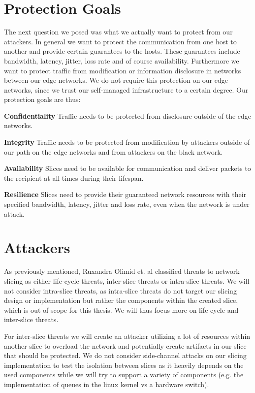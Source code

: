 \section{Protection Goals}
\label{protection_goals}
The next question we posed was what we actually want to protect from our attackers. In general we want to protect the communication from one host to another and provide certain guarantees to the hosts. These guarantees include bandwidth, latency, jitter, loss rate and of course availability. Furthermore we want to protect traffic from modification or information disclosure in networks between our edge networks. We do not require this protection on our edge networks, since we trust our self-managed infrastructure to a certain degree. Our protection goals are thus:
\begin{description}[style=multiline, labelwidth=0.7cm]
    \item[\namedlabel{P1}{P1}] \textbf{Confidentiality} Traffic needs to be protected from disclosure outside of the edge networks.
    \item[\namedlabel{P2}{P2}] \textbf{Integrity} Traffic needs to be protected from modification by attackers outside of our path on the edge networks and from attackers on the black network.
    \item[\namedlabel{P3}{P3}] \textbf{Availability} Slices need to be available for communication and deliver packets to the recipient at all times during their lifespan.
    \item[\namedlabel{P4}{P4}] \textbf{Resilience} Slices need to provide their guaranteed network resources with their specified bandwidth, latency, jitter and loss rate, even when the network is under attack.
\end{description}

\section{Attackers}
\label{adversaries}
As previously mentioned, Ruxandra Olimid et. al \cite{SE2} classified threats to network slicing as either life-cycle threats, inter-slice threats or intra-slice threats. We will not consider intra-slice threats, as intra-slice threats do not target our slicing design or implementation but rather the components within the created slice, which is out of scope for this thesis. We will thus focus more on life-cycle and inter-slice threats.

For inter-slice threats we will create an attacker utilizing a lot of resources within another slice to overload the network and potentially create artifacts in our slice that should be protected. We do not consider side-channel attacks on our slicing implementation to test the isolation between slices as it heavily depends on the used components while we will try to support a variety of components (e.g. the implementation of queues in the linux kernel vs a hardware switch).

